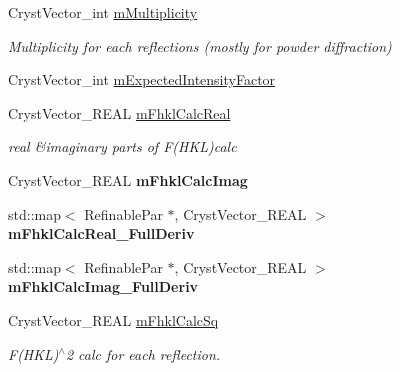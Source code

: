 \begin{DoxyCompactItemize}
Cryst\+Vector\+\_\+int \mbox{\hyperlink{class_obj_cryst_1_1_scattering_data_affaae453ef7ac110ab7a1f0abb2c50a7}{m\+Multiplicity}}
\begin{DoxyCompactList}\small\item\em Multiplicity for each reflections (mostly for powder diffraction) \end{DoxyCompactList}\item 
Cryst\+Vector\+\_\+int \mbox{\hyperlink{class_obj_cryst_1_1_scattering_data_a8296cf05015c7c4bbfc1dc7b443e3096}{m\+Expected\+Intensity\+Factor}}
\item 
\mbox{\label{class_obj_cryst_1_1_scattering_data_a8544897db01ff8f9cb7a245c49c7a4e4}} 
Cryst\+Vector\+\_\+\+R\+E\+AL \mbox{\hyperlink{class_obj_cryst_1_1_scattering_data_a8544897db01ff8f9cb7a245c49c7a4e4}{m\+Fhkl\+Calc\+Real}}
\begin{DoxyCompactList}\small\item\em real \&imaginary parts of F(\+H\+K\+L)calc \end{DoxyCompactList}\item 
\mbox{\label{class_obj_cryst_1_1_scattering_data_a048112ed1fa83eeb209843140e86a41c}} 
Cryst\+Vector\+\_\+\+R\+E\+AL {\bfseries m\+Fhkl\+Calc\+Imag}
\item 
\mbox{\label{class_obj_cryst_1_1_scattering_data_ab48990a96d3b9ab69218d25e8ce33b31}} 
std\+::map$<$ Refinable\+Par $\ast$, Cryst\+Vector\+\_\+\+R\+E\+AL $>$ {\bfseries m\+Fhkl\+Calc\+Real\+\_\+\+Full\+Deriv}
\item 
\mbox{\label{class_obj_cryst_1_1_scattering_data_a4e187727f1f6e5f210e420550f4e9264}} 
std\+::map$<$ Refinable\+Par $\ast$, Cryst\+Vector\+\_\+\+R\+E\+AL $>$ {\bfseries m\+Fhkl\+Calc\+Imag\+\_\+\+Full\+Deriv}
\item 
\mbox{\label{class_obj_cryst_1_1_scattering_data_a5c61007b1d35f8af192cbb86da7c1ba9}} 
Cryst\+Vector\+\_\+\+R\+E\+AL \mbox{\hyperlink{class_obj_cryst_1_1_scattering_data_a5c61007b1d35f8af192cbb86da7c1ba9}{m\+Fhkl\+Calc\+Sq}}
\begin{DoxyCompactList}\small\item\em F(\+H\+K\+L)$^\wedge$2 calc for each reflection. \end{DoxyCompactList}\item 

\end{DoxyCompactItemize}
